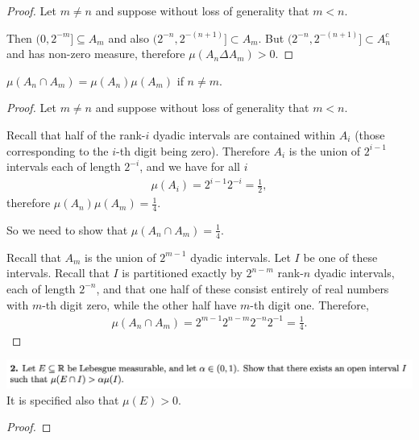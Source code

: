 \begin{proof}
  Let $m \neq n$ and suppose without loss of generality that $m < n$.

  Then $(0, 2^{-m}] \subseteq A_m$ and also $(2^{-n}, 2^{-(n+1)}] \subset A_m$.
  But $(2^{-n}, 2^{-(n+1)}] \subset A_n^c$ and has non-zero measure, therefore $\mu(A_n \Delta A_m) > 0$.
\end{proof}

\begin{claim*}
  $\mu(A_n \cap A_m) = \mu(A_n)\mu(A_m)$ if $n \neq m$.
\end{claim*}

\begin{proof}
  Let $m \neq n$ and suppose without loss of generality that $m < n$.

  Recall that half of the rank-$i$ dyadic intervals are contained within $A_i$ (those corresponding to
  the $i$-th digit being zero). Therefore $A_i$ is the union of $2^{i-1}$ intervals each of length $2^{-i}$,
  and we have for all $i$
  \begin{align*}
     \mu(A_i) = 2^{i-1}2^{-i} =\frac{1}{2},
  \end{align*}
  therefore $\mu(A_n)\mu(A_m) = \frac{1}{4}$.

  So we need to show that $\mu(A_n \cap A_m) = \frac{1}{4}$.

  Recall that $A_m$ is the union of $2^{m-1}$ dyadic intervals. Let $I$ be one of these intervals. Recall
  that $I$ is partitioned exactly by $2^{n-m}$ rank-$n$ dyadic intervals, each of length $2^{-n}$, and that one
  half of these consist entirely of real numbers with $m$-th digit zero, while the other half have $m$-th digit
  one. Therefore,
  \begin{align*}
    \mu(A_n \cap A_m) = 2^{m-1}2^{n-m}2^{-n}2^{-1} = \frac{1}{4}.
  \end{align*}
\end{proof}
\newpage
\begin{mdframed}
\includegraphics[width=400pt]{img/analysis--berkeley-202a-hw05-2e34.png}
It is specified also that $\mu(E) > 0$.
\end{mdframed}


\begin{proof}

\end{proof}


